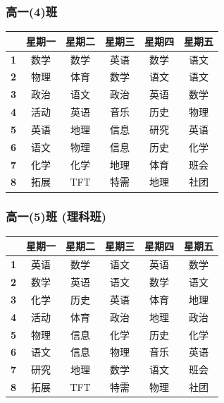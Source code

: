 \documentclass[a4paper]{article}
\begin{document}
  \subsubsection{高一(4)班}
   \begin{tabular}{|c|c|c|c|c|c|}
   \hline
   & \bf 星期一 & \bf 星期二 & \bf 星期三 & \bf 星期四 & \bf 星期五 \\\hline
   \bf 1 & 数学 & 数学 & 英语 & 数学 & 语文 \\\hline
   \bf 2 & 物理 & 体育 & 数学 & 语文 & 语文 \\\hline
   \bf 3 & 政治 & 语文 & 政治 & 英语 & 数学 \\\hline
   \bf 4 & 活动 & 英语 & 音乐 & 历史 & 物理 \\\hline
   \bf 5 & 英语 & 地理 & 信息 & 研究 & 英语 \\\hline
   \bf 6 & 语文 & 物理 & 信息 & 历史 & 化学 \\\hline
   \bf 7 & 化学 & 化学 & 地理 & 体育 & 班会 \\\hline
   \bf 8 & 拓展 & TFT  & 特需 & 地理 & 社团 \\\hline
   \end{tabular}
  \subsubsection{高一(5)班 (理科班)}
   \begin{tabular}{|c|c|c|c|c|c|}
   \hline
   & \bf 星期一 & \bf 星期二 & \bf 星期三 & \bf 星期四 & \bf 星期五 \\\hline
   \bf 1 & 英语 & 数学 & 语文 & 英语 & 数学 \\\hline
   \bf 2 & 数学 & 英语 & 语文 & 数学 & 语文 \\\hline
   \bf 3 & 化学 & 历史 & 英语 & 体育 & 地理 \\\hline
   \bf 4 & 活动 & 体育 & 政治 & 地理 & 政治 \\\hline
   \bf 5 & 物理 & 信息 & 化学 & 历史 & 化学 \\\hline
   \bf 6 & 语文 & 信息 & 物理 & 音乐 & 英语 \\\hline
   \bf 7 & 研究 & 地理 & 数学 & 语文 & 班会 \\\hline
   \bf 8 & 拓展 & TFT  & 特需 & 物理 & 社团 \\\hline
   \end{tabular}
\end{document}
